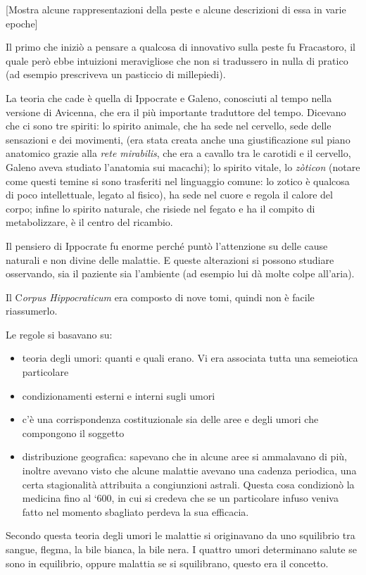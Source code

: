 {[}Mostra alcune rappresentazioni della peste e alcune descrizioni di
essa in varie epoche{]}

Il primo che iniziò a pensare a qualcosa di innovativo sulla peste fu
Fracastoro, il quale però ebbe intuizioni meravigliose che non si
tradussero in nulla di pratico (ad esempio prescriveva un pasticcio di
millepiedi).

La teoria che cade è quella di Ippocrate e Galeno, conosciuti al tempo
nella versione di Avicenna, che era il più importante traduttore del
tempo. Dicevano che ci sono tre spiriti: lo spirito animale, che ha sede
nel cervello, sede delle sensazioni e dei movimenti, (era stata creata
anche una giustificazione sul piano anatomico grazie alla \emph{rete
mirabilis}, che era a cavallo tra le carotidi e il cervello, Galeno
aveva studiato l'anatomia sui macachi); lo spirito vitale, lo
\emph{zòticon} (notare come questi temine si sono trasferiti nel
linguaggio comune: lo zotico è qualcosa di poco intellettuale, legato al
fisico), ha sede nel cuore e regola il calore del corpo; infine lo
spirito naturale, che risiede nel fegato e ha il compito di
metabolizzare, è il centro del ricambio.

Il pensiero di Ippocrate fu enorme perché puntò l'attenzione su delle
cause naturali e non divine delle malattie. E queste alterazioni si
possono studiare osservando, sia il paziente sia l'ambiente (ad esempio
lui dà molte colpe all'aria).

Il C\emph{orpus Hippocraticum} era composto di nove tomi, quindi non è
facile riassumerlo.

Le regole si basavano su:
\begin{itemize}
\item teoria degli umori: quanti e quali erano. Vi era associata tutta una
semeiotica particolare
\item condizionamenti esterni e interni sugli umori
\item c'è una corrispondenza costituzionale sia delle aree e degli umori che
compongono il soggetto
\item distribuzione geografica: sapevano che in alcune aree si ammalavano di
più, inoltre avevano visto che alcune malattie avevano una cadenza
periodica, una certa stagionalità attribuita a congiunzioni astrali.
Questa cosa condizionò la medicina fino al `600, in cui si credeva che
se un particolare infuso veniva fatto nel momento sbagliato perdeva la
sua efficacia.
\end{itemize}

Secondo questa teoria degli umori le malattie si originavano da uno
squilibrio tra sangue, flegma, la bile bianca, la bile nera. I quattro
umori determinano salute se sono in equilibrio, oppure malattia se si
squilibrano, questo era il concetto.

